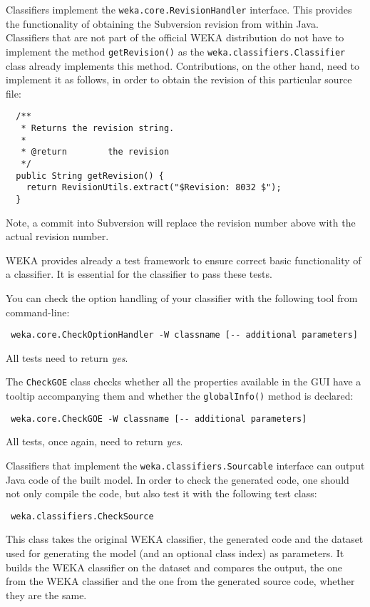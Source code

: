 \label{classifier_revisions}
Classifiers implement the \texttt{weka.core.RevisionHandler} interface. This
provides the functionality of obtaining the Subversion revision from within
Java. Classifiers that are not part of the official WEKA distribution
do not have to implement the method \texttt{getRevision()} as the
\texttt{weka.classifiers.Classifier} class already implements this method.
Contributions, on the other hand, need to implement it as follows, in order to
obtain the revision of this particular source file:
\begin{verbatim}
  /**
   * Returns the revision string.
   *
   * @return        the revision
   */
  public String getRevision() {
    return RevisionUtils.extract("$Revision: 8032 $");
  }
\end{verbatim}
Note, a commit into Subversion will replace the revision number above with the
actual revision number.

WEKA provides already a test framework to ensure correct basic functionality of
a classifier. It is essential for the classifier to pass these tests.

You can check the option handling of your classifier with the following tool
from command-line:
\begin{verbatim}
 weka.core.CheckOptionHandler -W classname [-- additional parameters]
\end{verbatim}
All tests need to return \textit{yes}.

The \texttt{CheckGOE} class checks whether all the properties available in the
GUI have a tooltip accompanying them and whether the \texttt{globalInfo()}
method is declared:
\begin{verbatim}
 weka.core.CheckGOE -W classname [-- additional parameters]
\end{verbatim}
All tests, once again, need to return \textit{yes}.

Classifiers that implement the \texttt{weka.classifiers.Sourcable} interface can
output Java code of the built model. In order to check the generated  code, one
should not only compile the code, but also test it with the following test
class:
\begin{verbatim}
 weka.classifiers.CheckSource
\end{verbatim}
This class takes the original WEKA classifier, the generated code and the
dataset used for generating the model (and an optional class index) as
parameters. It builds the WEKA classifier on the dataset and compares the
output, the one from the WEKA classifier and the one from the generated source
code, whether they are the same.

